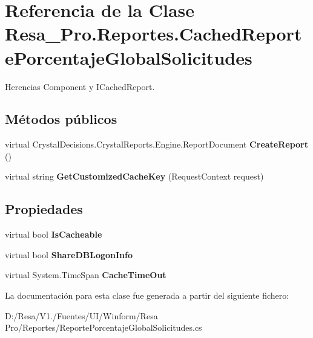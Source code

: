 \section{Referencia de la Clase Resa\+\_\+\+Pro.\+Reportes.\+Cached\+Reporte\+Porcentaje\+Global\+Solicitudes}
\label{class_resa___pro_1_1_reportes_1_1_cached_reporte_porcentaje_global_solicitudes}


Herencias Component y I\+Cached\+Report.

\subsection*{Métodos públicos}
\begin{DoxyCompactItemize}
\item 
virtual Crystal\+Decisions.\+Crystal\+Reports.\+Engine.\+Report\+Document {\bfseries Create\+Report} ()\label{class_resa___pro_1_1_reportes_1_1_cached_reporte_porcentaje_global_solicitudes_af46e87a7b483db25b670d893643918ee}

\item 
virtual string {\bfseries Get\+Customized\+Cache\+Key} (Request\+Context request)\label{class_resa___pro_1_1_reportes_1_1_cached_reporte_porcentaje_global_solicitudes_ad7ada3f28cbd0aca06b94a1cc8a58ede}

\end{DoxyCompactItemize}
\subsection*{Propiedades}
\begin{DoxyCompactItemize}
\item 
virtual bool {\bfseries Is\+Cacheable}\hspace{0.3cm}{\ttfamily  [get, set]}\label{class_resa___pro_1_1_reportes_1_1_cached_reporte_porcentaje_global_solicitudes_a1aeff89980a384648525aab09c3d2b76}

\item 
virtual bool {\bfseries Share\+D\+B\+Logon\+Info}\hspace{0.3cm}{\ttfamily  [get, set]}\label{class_resa___pro_1_1_reportes_1_1_cached_reporte_porcentaje_global_solicitudes_a3946bc897a8d6bc74c1841af29838141}

\item 
virtual System.\+Time\+Span {\bfseries Cache\+Time\+Out}\hspace{0.3cm}{\ttfamily  [get, set]}\label{class_resa___pro_1_1_reportes_1_1_cached_reporte_porcentaje_global_solicitudes_a758b34c7ba94c87017984d825fe4393a}

\end{DoxyCompactItemize}


La documentación para esta clase fue generada a partir del siguiente fichero\+:\begin{DoxyCompactItemize}
\item 
D\+:/\+Resa/\+V1./\+Fuentes/\+U\+I/\+Winform/\+Resa Pro/\+Reportes/Reporte\+Porcentaje\+Global\+Solicitudes.\+cs\end{DoxyCompactItemize}
